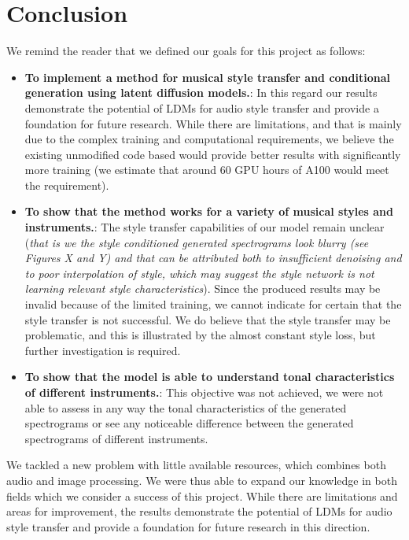 \section{Conclusion}

We remind the reader that we defined our goals for this project as follows:
\begin{itemize}
    \item \textbf{To implement a method for musical style transfer and conditional generation using latent diffusion models.}: In this regard our results demonstrate the potential of LDMs for audio style transfer and provide a foundation for future research. While there are limitations, and that is mainly due to the complex training and computational requirements, we believe the existing unmodified code based would provide better results with significantly more training (we estimate that around 60 GPU hours of A100 would meet the requirement).
    \item \textbf{To show that the method works for a variety of musical styles and instruments.}: The style transfer capabilities of our model remain unclear (\textit{that is we the style conditioned generated spectrograms look blurry (see Figures X and Y) and that can be attributed both to insufficient denoising and to poor interpolation of style, which may suggest the style network is not learning relevant style characteristics}). Since the produced results may be invalid because of the limited training, we cannot indicate for certain that the style transfer is not successful. We do believe that the style transfer may be problematic, and this is illustrated by the almost constant style loss, but further investigation is required.
    \item \textbf{To show that the model is able to understand tonal characteristics of different instruments.}: This objective was not achieved, we were not able to assess in any way the tonal characteristics of the generated spectrograms or see any noticeable difference between the generated spectrograms of different instruments.
\end{itemize}

\vspace{0.5cm}


\noindent We tackled a new problem with little available resources, which combines both audio and image processing. We were thus able to expand our knowledge in both fields which we consider a success of this project. While there are limitations and areas for improvement, the results demonstrate the potential of LDMs for audio style transfer and provide a foundation for future research in this direction. 

